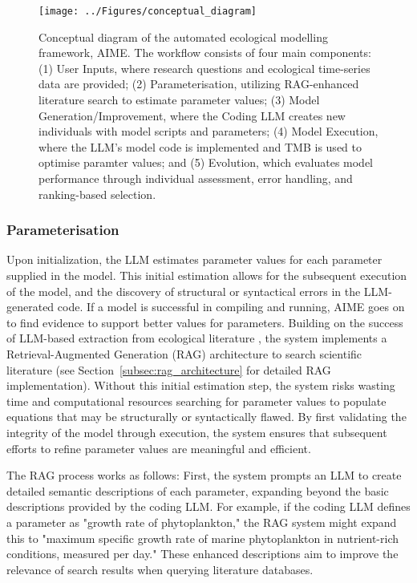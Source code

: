 \begin{landscape}
    \begin{figure}[p]
    \centering
    \texttt{[image: ../Figures/conceptual\_diagram]}
    \begingroup
    \small
    \caption{Conceptual diagram of the automated ecological modelling framework, AIME. The workflow consists of four main components: (1) User Inputs, where research questions and ecological time-series data are provided; (2) Parameterisation, utilizing RAG-enhanced literature search to estimate parameter values; (3) Model Generation/Improvement, where the Coding LLM creates new individuals with model scripts and parameters; (4) Model Execution, where the LLM's model code is implemented and TMB is used to optimise paramter values; and (5) Evolution, which evaluates model performance through individual assessment, error handling, and ranking-based selection.}
    \label{fig:conceptual}
    \endgroup
    \end{figure}
    \end{landscape}

\subsubsection{Parameterisation}
Upon initialization, the LLM estimates parameter values for each parameter supplied in the model. This initial estimation allows for the subsequent execution of the model, and the discovery of structural or syntactical errors in the LLM-generated code. If a model is successful in compiling and running, AIME goes on to find evidence to support better values for parameters. Building on the success of LLM-based extraction from ecological literature \citep{keck2025extracting,spillias2024evaluating}, the system implements a Retrieval-Augmented Generation (RAG) architecture to search scientific literature (see Section~\ref{subsec:rag_architecture} for detailed RAG implementation). Without this initial estimation step, the system risks wasting time and computational resources searching for parameter values to populate equations that may be structurally or syntactically flawed. By first validating the integrity of the model through execution, the system ensures that subsequent efforts to refine parameter values are meaningful and efficient.

The RAG process works as follows: First, the system prompts an LLM to create detailed semantic descriptions of each parameter, expanding beyond the basic descriptions provided by the coding LLM. For example, if the coding LLM defines a parameter as "growth rate of phytoplankton," the RAG system might expand this to "maximum specific growth rate of marine phytoplankton in nutrient-rich conditions, measured per day." These enhanced descriptions aim to improve the relevance of search results when querying literature databases. 


